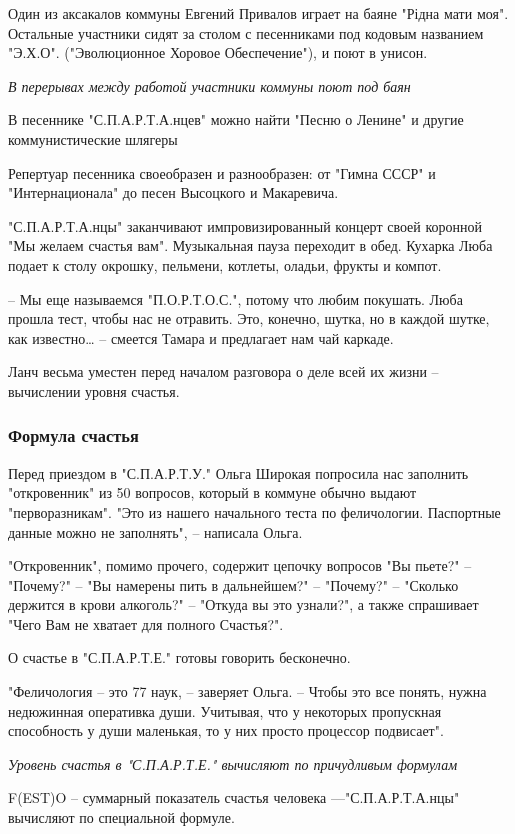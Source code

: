 Один из аксакалов коммуны Евгений Привалов играет на баяне "Рідна мати моя".
Остальные участники сидят за столом с песенниками под кодовым названием
"Э.Х.О". ("Эволюционное Хоровое Обеспечение"), и поют в унисон.

{\em
В перерывах между работой участники коммуны поют под баян
\/}

В песеннике "С.П.А.Р.Т.А.нцев" можно найти "Песню о Ленине" и другие
коммунистические шлягеры

Репертуар песенника своеобразен и разнообразен: от "Гимна СССР" и
"Интернационала" до песен Высоцкого и Макаревича.

"С.П.А.Р.Т.А.нцы" заканчивают импровизированный концерт своей коронной "Мы
желаем счастья вам". Музыкальная пауза переходит в обед. Кухарка Люба подает к
столу окрошку, пельмени, котлеты, оладьи, фрукты и компот.

– Мы еще называемся "П.О.Р.Т.О.С.", потому что любим покушать. Люба прошла
тест, чтобы нас не отравить. Это, конечно, шутка, но в каждой шутке, как
известно… – смеется Тамара и предлагает нам чай каркаде.

Ланч весьма уместен перед началом разговора о деле всей их жизни – вычислении
уровня счастья.

\subsubsection{Формула счастья}

Перед приездом в "С.П.А.Р.Т.У." Ольга Широкая попросила нас заполнить
"откровенник" из 50 вопросов, который в коммуне обычно выдают "перворазникам".
"Это из нашего начального теста по феличологии. Паспортные данные можно не
заполнять", – написала Ольга.

"Откровенник", помимо прочего, содержит цепочку вопросов "Вы пьете?" –
"Почему?" – "Вы намерены пить в дальнейшем?" – "Почему?" – "Сколько держится в
крови алкоголь?" – "Откуда вы это узнали?", а также спрашивает "Чего Вам не
хватает для полного Счастья?". 

О счастье в "С.П.А.Р.Т.Е." готовы говорить бесконечно.

"Феличология – это 77 наук, – заверяет Ольга. – Чтобы это все понять, нужна
недюжинная оперативка души. Учитывая, что у некоторых пропускная способность у
души маленькая, то у них просто процессор подвисает".

{\em
Уровень счастья в "С.П.А.Р.Т.Е." вычисляют по причудливым формулам
\/}

F(EST)O – суммарный показатель счастья человека —"С.П.А.Р.Т.А.нцы" вычисляют по
специальной формуле.

